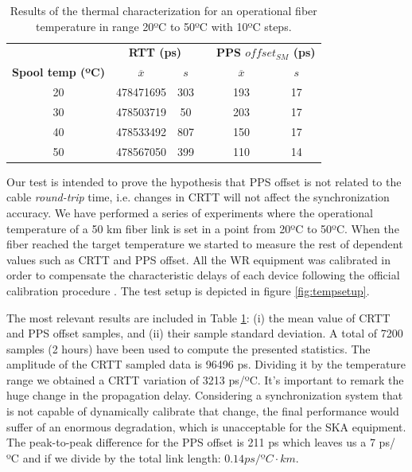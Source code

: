 \begin{table}\centering
	\begin{tabular}{@{} cccccc@{}}%
		& \multicolumn{2}{c}{\bfseries{RTT (ps)}} & &
		\multicolumn{2}{c}{\bfseries{PPS $offset_{SM}$ (ps)}} \\
		\cmidrule(l){2-3}  \cmidrule{5-6}
		\textbf{Spool temp (ºC)} & $\overline{x}$ & $s$ & & $\overline{x}$ 
		& $s$ \\ \midrule
		\small{20} & 478471695 & 303 & & 193 & 17 \\
		\small{30} & 478503719 & 50  & & 203 & 17 \\
		\small{40} & 478533492 & 807 & & 150 & 17 \\
		\small{50} & 478567050 & 399 & & 110 & 14 \\
		\bottomrule
	\end{tabular}
	\caption{Results of the thermal characterization for an operational fiber 
		temperature in range 20ºC to 50ºC with 10ºC steps.}
	\label{tab:temp}
\end{table}

Our test is intended to prove the hypothesis that PPS offset is not related to 
the cable \textit{round-trip} time, i.e. changes in CRTT will not affect the 
synchronization accuracy. We have performed a series of experiments where the 
operational temperature of a 50 km fiber link is set in a point from 20ºC to 
50ºC. When the fiber reached the target temperature we started to measure the 
rest of dependent values such as CRTT and PPS offset. All the WR equipment was 
calibrated in order to compensate the characteristic delays of each device 
following the official calibration procedure \cite{man:calib}.  The test setup 
is depicted in figure \ref{fig:tempsetup}.

The most relevant results are included in Table \ref{tab:temp}: (i) the mean 
value of CRTT and PPS offset samples, and (ii) their sample standard deviation. 
A total of 7200 samples (2 hours) have been used to compute the presented 
statistics. The amplitude of the CRTT sampled data is 96496 ps. Dividing it by 
the temperature range we obtained a CRTT variation of 3213 ps/ºC. It's 
important to remark the huge change in the propagation delay. Considering a 
synchronization system that is not capable of dynamically calibrate that 
change, the final performance would suffer of an enormous degradation, which is 
unacceptable for the SKA equipment. The peak-to-peak difference for the PPS 
offset is 211 ps which leaves us a 7 ps/ºC and if we divide by the total link 
length: $0.14 ps/ºC \cdot km$.

